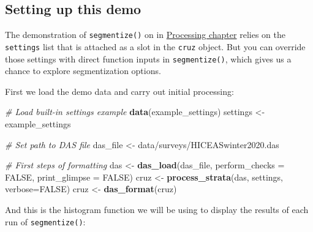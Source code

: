 \documentclass[
]{book}
\newenvironment{Shaded}{\begin{snugshade}}{\end{snugshade}}
\newcommand{\AttributeTok}[1]{\textcolor[rgb]{0.13,0.29,0.53}{#1}}
\newcommand{\CommentTok}[1]{\textcolor[rgb]{0.56,0.35,0.01}{\textit{#1}}}
\newcommand{\ConstantTok}[1]{\textcolor[rgb]{0.56,0.35,0.01}{#1}}
\newcommand{\FunctionTok}[1]{\textcolor[rgb]{0.13,0.29,0.53}{\textbf{#1}}}
\newcommand{\NormalTok}[1]{#1}
\newcommand{\OtherTok}[1]{\textcolor[rgb]{0.56,0.35,0.01}{#1}}
\newcommand{\StringTok}[1]{\textcolor[rgb]{0.31,0.60,0.02}{#1}}
\begin{document}
\hypertarget{setting-up-this-demo}{%
\subsection*{Setting up this demo}\label{setting-up-this-demo}}

The demonstration of \texttt{segmentize()} on in \protect\hyperlink{processing}{Processing chapter} relies on the \texttt{settings} list that is attached as a slot in the \texttt{cruz} object. But you can override those settings with direct function inputs in \texttt{segmentize()}, which gives us a chance to explore segmentization options.

First we load the demo data and carry out initial processing:

\begin{Shaded}
\begin{Highlighting}[]
\CommentTok{\# Load built{-}in settings example}
\FunctionTok{data}\NormalTok{(example\_settings)}
\NormalTok{settings }\OtherTok{\textless{}{-}}\NormalTok{ example\_settings}

\CommentTok{\# Set path to DAS file}
\NormalTok{das\_file }\OtherTok{\textless{}{-}} \StringTok{\textquotesingle{}data/surveys/HICEASwinter2020.das\textquotesingle{}}

\CommentTok{\# First steps of formatting}
\NormalTok{das }\OtherTok{\textless{}{-}} \FunctionTok{das\_load}\NormalTok{(das\_file, }
                \AttributeTok{perform\_checks =} \ConstantTok{FALSE}\NormalTok{,}
                \AttributeTok{print\_glimpse =} \ConstantTok{FALSE}\NormalTok{)}
\NormalTok{cruz }\OtherTok{\textless{}{-}} \FunctionTok{process\_strata}\NormalTok{(das,}
\NormalTok{                       settings,}
                       \AttributeTok{verbose=}\ConstantTok{FALSE}\NormalTok{)}
\NormalTok{cruz }\OtherTok{\textless{}{-}} \FunctionTok{das\_format}\NormalTok{(cruz)}
\end{Highlighting}
\end{Shaded}

And this is the histogram function we will be using to display the results of each run of \texttt{segmentize()}:
\end{document}
